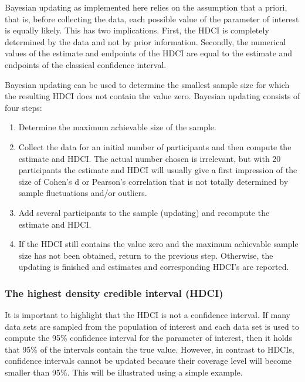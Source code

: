 \documentclass[
  letterpaper,
  DIV=11,
  numbers=noendperiod]{scrartcl}
\begin{document}
Bayesian updating as implemented here relies on the assumption that a
priori, that is, before collecting the data, each possible value of the
parameter of interest is equally likely. This has two implications.
First, the HDCI is completely determined by the data and not by prior
information. Secondly, the numerical values of the estimate and
endpoints of the HDCI are equal to the estimate and endpoints of the
classical confidence interval.

Bayesian updating can be used to determine the smallest sample size for
which the resulting HDCI does not contain the value zero. Bayesian
updating consists of four steps:

\begin{enumerate}
\def\labelenumi{\arabic{enumi}.}
\item
  Determine the maximum achievable size of the sample.
\item
  Collect the data for an initial number of participants and then
  compute the estimate and HDCI. The actual number chosen is irrelevant,
  but with 20 participants the estimate and HDCI will usually give a
  first impression of the size of Cohen's d or Pearson's correlation
  that is not totally determined by sample fluctuations and/or outliers.
\item
  Add several participants to the sample (updating) and recompute the
  estimate and HDCI.
\item
  If the HDCI still contains the value zero and the maximum achievable
  sample size has not been obtained, return to the previous step.
  Otherwise, the updating is finished and estimates and corresponding
  HDCI's are reported.
\end{enumerate}

\subsubsection{The highest density credible interval
(HDCI)}\label{the-highest-density-credible-interval-hdci}

It is important to highlight that the HDCI is not a confidence interval.
If many data sets are sampled from the population of interest and each
data set is used to compute the 95\% confidence interval for the
parameter of interest, then it holds that 95\% of the intervals contain
the true value. However, in contrast to HDCIs, confidence intervals
cannot be updated because their coverage level will become smaller than
95\%. This will be illustrated using a simple example.
\end{document}
